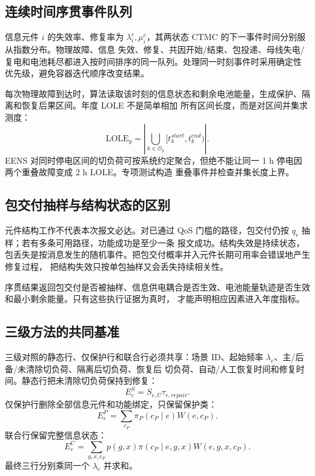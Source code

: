 \subsection{连续时间序贯事件队列}
信息元件 $i$ 的失效率、修复率为 $\lambda_i^c,\mu_i^c$，其两状态 CTMC 的下一事件时间分别服从指数分布。物理故障、信息
失效、修复、共因开始/结束、包投递、母线失电/复电和电池耗尽都进入按时间排序的同一队列。处理同一时刻事件时采用确定性
优先级，避免容器迭代顺序改变结果。

每次物理故障到达时，算法读取该时刻的信息状态和剩余电池能量，生成保护、隔离和恢复后果区间。年度 LOLE 不是简单相加
所有区间长度，而是对区间并集求测度：
\begin{equation}
 \mathrm{LOLE}_{y}=\left|\bigcup_{k\in\mathcal O_y}
 [t_k^{start},t_k^{end})\right|.
\end{equation}
EENS 对同时停电区间的切负荷可按系统约定聚合，但绝不能让同一 1 h 停电因两个重叠故障变成 2 h LOLE。专项测试构造
重叠事件并检查并集长度上界。

\subsection{包交付抽样与结构状态的区别}
元件结构工作不代表本次报文必达。对已通过 QoS 门槛的路径，包交付仍按 $q_r$ 抽样；若有多条可用路径，功能成功是至少一条
报文成功。结构失效是持续状态，包丢失是按消息发生的随机事件。把包交付概率并入元件长期可用率会错误地产生修复过程，
把结构失效只按单包抽样又会丢失持续相关性。

序贯结果返回包交付是否被抽样、信息供电耦合是否生效、电池能量轨迹是否生效和最小剩余能量。只有这些执行证据为真时，
才能声明相应因素进入年度指标。

\subsection{三级方法的共同基准}
三级对照的静态行、仅保护行和联合行必须共享：场景 ID、起始频率 $\lambda_e$、主/后备/未清除切负荷、隔离后切负荷、恢复后
切负荷、自动/人工恢复时间和修复时间。静态行把未清除切负荷保持到修复：
\begin{equation}
 E_e^S=S_{e,U}\tau_{e,repair}.
\end{equation}
仅保护行删除全部信息元件和功能绑定，只保留保护类：
\begin{equation}
 E_e^P=\sum_{c_P}\pi_P(c_P\mid e)W(e,c_P).
\end{equation}
联合行保留完整信息状态：
\begin{equation}
 E_e^C=\sum_{g,x,c_P}p(g,x)\pi(c_P\mid e,g,x)W(e,g,x,c_P).
\end{equation}
最终三行分别乘同一个 $\lambda_e$ 并求和。

